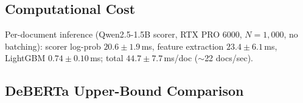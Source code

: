 \begin{table}[h]
\centering
\footnotesize
\caption{Bootstrap $\Kempirical$ stability (1{,}000 resamples). Each row reports the fraction of resamples yielding each $\Kempirical$ value and the resulting 95\% CI. Eight of ten configurations are perfectly stable; two boundary cases show mild variability (CI width~1).}
\label{tab:bootstrap_kstar}
\end{table}

\subsection{Computational Cost}
\label{sec:computation_cost}

Per-document inference (Qwen2.5-1.5B scorer, RTX PRO 6000, $N{=}1{,}000$, no batching): scorer log-prob $20.6 \pm 1.9$\,ms, feature extraction $23.4 \pm 6.1$\,ms, LightGBM $0.74 \pm 0.10$\,ms; total $44.7 \pm 7.7$\,ms/doc (${\sim}$22 docs/sec).

\subsection{DeBERTa Upper-Bound Comparison}
\label{sec:deberta_upperbound}

